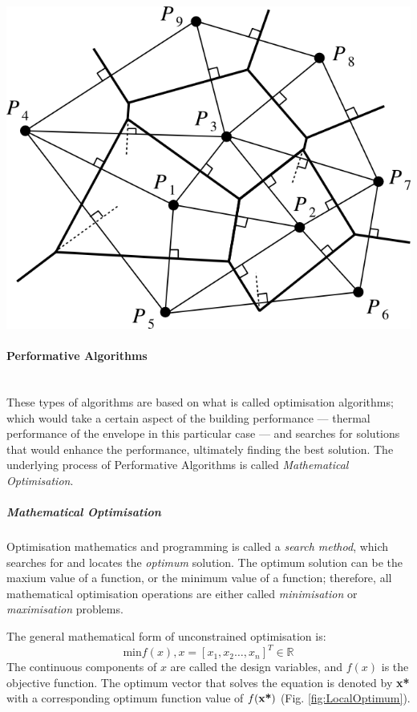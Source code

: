 \documentclass[11pt,a4paper,oneside]{article}
\newenvironment{Figure}		%
	{\par\medskip\noindent\minipage{\linewidth}}
	{\endminipage\par\medskip}
\begin{document}
\begin{multicols}{2}
\begin{Figure}
	\centering
	\includegraphics[width=0.8\linewidth]{./Images/3-VoronoiDiagram}
	\label{fig:Voronoi}
\end{Figure}

	\paragraph{Performative Algorithms}\mbox{}\\

	These types of algorithms are based on what is called optimisation algorithms; which would take a certain aspect of the building performance --- thermal performance of the envelope in this particular case --- and searches for solutions that would enhance the performance, ultimately finding the best solution. The underlying process of Performative Algorithms is called \emph{Mathematical Optimisation}.

		\subparagraph{Mathematical Optimisation}

		Optimisation mathematics and programming is called a \emph{search method}, which searches for and locates the \emph{optimum} solution. The optimum solution can be the maxium value of a function, or the minimum value of a function; therefore, all mathematical optimisation operations are either called \emph{minimisation} or \emph{maximisation} problems.

		The general mathematical form of unconstrained optimisation is:\\
\begin{equation}
\text{min} f(x), x=[x_1,x_2\dots,x_n]^T \in \mathbb{R}
\end{equation}
The continuous components of $x$ are called the design variables, and $f(x)$ is the objective function. The optimum vector that solves the equation is denoted by \textbf{x*} with a corresponding optimum function value of $f(\text{\textbf{x*}})$ (Fig. \ref{fig:LocalOptimum}).


\end{multicols}
\end{document}
